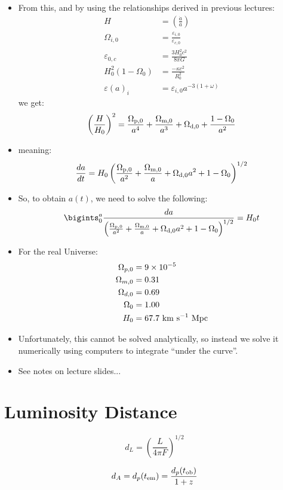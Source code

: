 \documentclass[11pt]{article}
\begin{document}
\begin{itemize}
\item From this, and by using the relationships derived in previous lectures:
\begin{align}
    H &= \left(\frac{\dot{a}}{a}\right)\\
    \Omega_{i,0}&=\frac{\varepsilon{_{i,0}}}{\varepsilon{_{c,0}}}\\
    \varepsilon{_{0,c}}&=\frac{3H_0^2c^2}{8\pi G}\\
    H_0^2(1-\Omega_0)&= \frac{-\kappa c^2}{R_0^2}\\
    \varepsilon{(a)_i}&=\varepsilon{_{i,0}}a^{-3(1+\omega)}
\end{align}
we get:
\begin{equation}
\left(\frac{H}{H_0}\right)^2=\frac{\Omega_{\rm p, 0}}{a^4}+\frac{\Omega_{\rm m, 0}}{a^3} + \Omega_{\rm d, 0} + \frac{1-\Omega_0}{a^2}
\end{equation}
\item meaning:
\begin{equation}
    \frac{da}{dt}=H_0\left(\frac{\Omega_{\rm p, 0}}{a^2}+\frac{\Omega_{\rm m, 0}}{a} + \Omega_{\rm d, 0}a^2 + 1-\Omega_0\right)^{1/2}
\end{equation}
\item So, to obtain $a(t)$, we need to solve the following:
\begin{equation}
        \bigints_0^a{\frac{da}{\left(\frac{\Omega_{\rm p, 0}}{a^2}+\frac{\Omega_{\rm m, 0}}{a} + \Omega_{\rm d, 0}a^2 + 1-\Omega_0\right)^{1/2}}} = H_0t
\end{equation}
\item For the real Universe:
\begin{align}
\Omega_{p,0}&=9\times10^{-5}\\
\Omega_{m,0}&=0.31\\
\Omega_{d,0}&=0.69\\
\Omega_{0}&=1.00\\
H_0 &= 67.7~{\rm km~s^{-1}~Mpc}
\end{align}
\item Unfortunately, this cannot be solved analytically, so instead we solve it numerically using computers to integrate ``under the curve''.
\item See notes on lecture slides...
\end{itemize}

\section{Luminosity Distance}
\begin{equation}
    d_L = \left(\frac{L}{4\pi F}\right)^{1/2}
\end{equation}

\begin{equation}
d_A = d_p(t_{\rm em}) = \frac{d_p(t_{\rm ob})}{1+z}
\end{equation}
\end{document}
